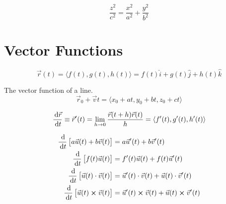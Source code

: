 \begin{example}
	\begin{equation}
		\frac{z^2}{c^2} = \frac{x^2}{a^2} + \frac{y^2}{b^2}
	\end{equation}
\end{example}

\section{Vector Functions}

\begin{definition}
	\begin{equation}
		\vec r(t) = \langle f(t), g(t), h(t) \rangle = f(t) \hat i + g(t) \hat j + h(t) \hat k
	\end{equation}
\end{definition}

\begin{example}
	The vector function of a line.
	\begin{equation}
		\vec r_0 + \vec v t = \langle x_0 + at, y_0 + bt, z_0 + ct \rangle
	\end{equation}
\end{example}

\begin{definition}
	\begin{equation}
		\frac{\D \vec r}{\D t} \equiv \vec r'(t) = \lim_{h \to 0} \frac{\vec r(t + h) \vec r(t)}{h} = \langle f'(t), g'(t), h'(t) \rangle
	\end{equation}
\end{definition}

\begin{definition}
	\begin{align}
		\frac{\D}{\D t} \left[a \vec u(t) + b \vec v(t)\right] &= a \vec u'(t) + b \vec v'(t)\\
		\frac{\D}{\D t} \left[f(t) \vec u(t)\right] &= f'(t) \vec u(t) + f(t) \vec u'(t)\\
		\frac{\D}{\D t} \left[\vec u(t) \cdot \vec v(t)\right] &= \vec u'(t) \cdot \vec v(t) + \vec u(t) \cdot \vec v'(t)\\
		\frac{\D}{\D t} \left[\vec u(t) \cross \vec v (t)\right] &= \vec u'(t) \cross \vec v(t) + \vec u(t) \cross \vec v'(t)
	\end{align}
\end{definition}